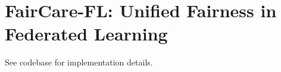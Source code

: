 \documentclass{article}
\begin{document}
\section{FairCare-FL: Unified Fairness in Federated Learning}
See codebase for implementation details.
\end{document}
